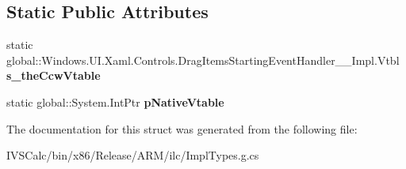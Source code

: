 \subsection*{Static Public Attributes}
\begin{DoxyCompactItemize}
\item 
\mbox{\label{struct_windows_1_1_u_i_1_1_xaml_1_1_controls_1_1_drag_items_starting_event_handler_____impl_1_1_vtbl_abe70614a6a1bdb28782e7bfdebf5878a}} 
static global\+::\+Windows.\+U\+I.\+Xaml.\+Controls.\+Drag\+Items\+Starting\+Event\+Handler\+\_\+\+\_\+\+Impl.\+Vtbl {\bfseries s\+\_\+the\+Ccw\+Vtable}
\item 
\mbox{\label{struct_windows_1_1_u_i_1_1_xaml_1_1_controls_1_1_drag_items_starting_event_handler_____impl_1_1_vtbl_aa662c57582eece923a53bc87d1b1063b}} 
static global\+::\+System.\+Int\+Ptr {\bfseries p\+Native\+Vtable}
\end{DoxyCompactItemize}


The documentation for this struct was generated from the following file\+:\begin{DoxyCompactItemize}
\item 
I\+V\+S\+Calc/bin/x86/\+Release/\+A\+R\+M/ilc/Impl\+Types.\+g.\+cs\end{DoxyCompactItemize}
